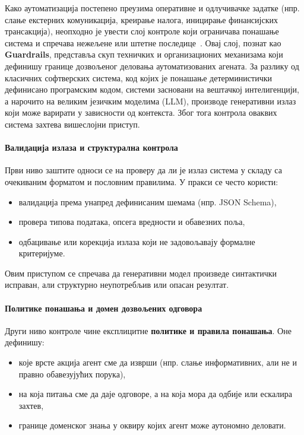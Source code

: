 Како аутоматизација постепено преузима оперативне и одлучивачке задатке
(нпр. слање екстерних комуникација, креирање налога, иницирање финансијских трансакција),
неопходно је увести слој контроле који ограничава понашање система и спречава нежељене или
штетне последице~\cite{bai2022,hleg2019}. Овај слој, познат као \textbf{Guardrails}, представља скуп техничких и
организационих механизама који дефинишу границе дозвољеног деловања аутоматизованих агената. За разлику од класичних софтверских система, код којих је понашање детерминистички дефинисано
програмским кодом, системи засновани на вештачкој интелигенцији, а нарочито на великим језичким
моделима (LLM), производе генеративни излаз који може варирати у зависности од контекста.
Због тога контрола оваквих система захтева вишеслојни приступ.

\paragraph{Валидација излаза и структурална контрола}

Први ниво заштите односи се на проверу да ли је излаз система у складу са очекиваним форматом
и пословним правилима. У пракси се често користи:
\begin{itemize}
    \item валидација према унапред дефинисаним шемама (нпр. JSON Schema),
    \item провера типова података, опсега вредности и обавезних поља,
    \item одбацивање или корекција излаза који не задовољавају формалне критеријуме.
\end{itemize}

Овим приступом се спречава да генеративни модел произведе синтактички исправан, али
структурно неупотребљив или опасан резултат.

\paragraph{Политике понашања и домен дозвољених одговора}

Други ниво контроле чине експлицитне \textbf{политике и правила понашања}.
Оне дефинишу:
\begin{itemize}
    \item које врсте акција агент сме да изврши (нпр. слање информативних, али не и правно обавезујућих порука),
    \item на која питања сме да даје одговоре, а на која мора да одбије или ескалира захтев,
    \item границе доменског знања у оквиру којих агент може аутономно деловати.
\end{itemize}

